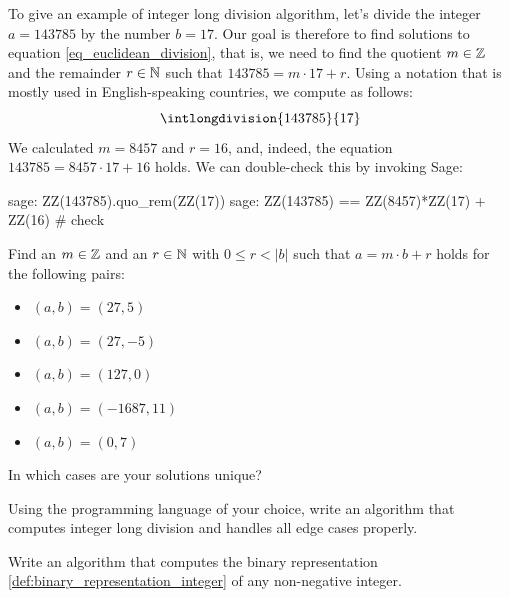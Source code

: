 \begin{example} To give an example of integer long division algorithm, let's divide the integer $a=143785$ by the number $b=17$. Our goal is therefore to find solutions to equation \ref{eq_euclidean_division}, that is, we need to find the quotient $m\in\mathbb{Z}$ and the remainder $r \in \mathbb{N}$ such that $143785 = m\cdot 17 + r$. Using a notation that is mostly used in English-speaking countries, we compute as follows:
\begin{equation}
\intlongdivision{143785}{17}
\end{equation}
We calculated $m=8457$ and $r=16$, and, indeed, the equation $143785 = 8457\cdot 17 + 16$ holds.  We can double-check this by invoking Sage:
\begin{sagecommandline}
sage: ZZ(143785).quo_rem(ZZ(17))
sage: ZZ(143785) == ZZ(8457)*ZZ(17) + ZZ(16) # check
\end{sagecommandline}

\end{example}
\begin{exercise}
Find an $m\in\mathbb{Z}$ and an $r\in\mathbb{N}$ with $0\leq r< |b|$ such that $a= m\cdot b +r$ holds for the following pairs:
\begin{itemize}\compactlist{}
 \item $(a,b) = (27,5)$ 
 \item $(a,b)=(27,-5)$
 \item $(a,b)=(127,0)$
 \item $(a,b)= (-1687, 11)$
 \item $(a,b)= (0, 7)$
 \end{itemize}
 In which cases are your solutions unique?
\end{exercise}
\begin{exercise}
Using the programming language of your choice, write an algorithm that computes integer long division and handles all edge cases properly.
\end{exercise}
\begin{exercise}
Write an algorithm that computes the binary representation \ref{def:binary_representation_integer} of any non-negative integer.
\end{exercise}

